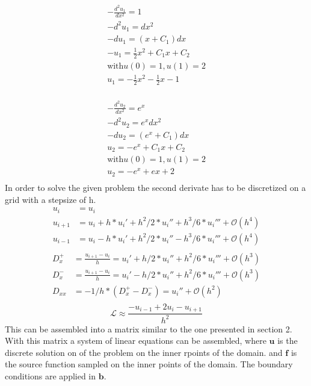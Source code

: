 \documentclass{article}
\begin{document}
\begin{align}
    -\frac{d^{2} u_1}{d x^{2}}=1 \\
    - d^2 u_1 = dx^2 \\
    - d u_1 = (x+C_1) dx\\
    - u_1 = \frac{1}{2}x^2 + C_1 x + C_2\\
    \text{with} u(0)=1,  u(1)=2 \\
    u_1 = -\frac{1}{2}x^2 - \frac{1}{2} x - 1\\
\end{align}

\begin{align}
    -\frac{d^{2} u_2}{d x^{2}}=e^x \\
    -d^2 u_2 = e^x dx^2 \\
    -d u_2 = (e^x+C_1) dx\\
    u_2 = -e^x + C_1 x + C_2\\
    \text{with} u(0)=1,  u(1)=2 \\
    u_2 = -e^x + e x + 2\\
\end{align}
In order to solve the given problem the second derivate has to be discretized on a grid with a stepsize of h.
\begin{align}
    u_i &= u_i\\
    u_{i+1} &= u_i + h * u_i' + h^2/2 * u_i'' + h^3/6 * u_i''' + \mathcal{O}\left(h^4\right)\\
    u_{i-1} &= u_i - h * u_i' + h^2/2 * u_i'' - h^3/6 * u_i''' + \mathcal{O}\left(h^4\right)\\
\end{align}
\begin{align}
    D_x^+ &= \frac{u_{i+1}-u_i}{h} = u_i' + h/2 * u_i'' + h^2/6 * u_i''' + \mathcal{O}\left(h^3\right)\\
    D_x^- &= \frac{u_{i+1}-u_i}{h} = u_i' - h/2 * u_i'' + h^2/6 * u_i''' + \mathcal{O}\left(h^3\right)\\
    D_{xx} &= -1/h*\left(D_x^+ - D_x^-\right) = u_i'' + \mathcal{O}\left(h^2\right)\\
\end{align}
\begin{equation}
    \mathcal{L} \approx \frac{-u_{i-1}+2u_i-u_{i+1}}{h^2}
\end{equation}
This can be assembled into a matrix similar to the one presented in section 2. With this matrix a system of linear equations can be assembled, where $\mathbf{u}$ is the discrete solution on of the problem on the inner rpoints of the domain. and $\mathbf{f}$ is the source function sampled on the inner points of the domain. The boundary conditions are applied in $\mathbf{b}$.
\end{document}
